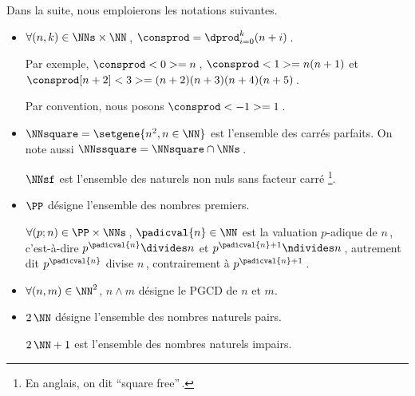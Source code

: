 Dans la suite, nous emploierons les notations suivantes.

\begin{itemize}
	\item $\forall (n, k) \in \NNs \times \NN$\,, $\consprod = \dprod_{i = 0}^{k} (n + i)$\,. 
	
	\noindent
	Par exemple,
	$\consprod<0> = n$\,,
	$\consprod<1> = n (n+1)$
	et
	$\consprod[n+2]<3> = (n+2) (n+3) (n+4) (n+5)$\,.
	
	\noindent
	Par convention, nous posons $\consprod<-1> = 1$\,.


	\medskip
	\item $\NNsquare = \setgene{n^2, n \in \NN}$ est l'ensemble des carrés parfaits.
	On note aussi $\NNssquare = \NNsquare \cap \NNs$\,.

	\noindent
	$\NNsf$ est l'ensemble des naturels non nuls sans facteur carré
	\footnote{
		En anglais, on dit \enquote{square free}\,.
	}.


	\medskip
	\item $\PP$ désigne l'ensemble des nombres premiers.
	
	\noindent
	$\forall (p ; n) \in \PP \times \NNs$\,, $\padicval{n} \in \NN$ est la valuation $p$-adique de $n$\,,
	c'est-à-dire 
	$p^{\padicval{n}} \divides n$ et $p^{\padicval{n} + 1} \ndivides n$\,,
	autrement dit
	$p^{\padicval{n}}$ divise $n$\,, contrairement à $p^{\padicval{n} + 1}$\,.


	\medskip
	\item $\forall (n , m) \in \NN^2$, $n \wedge m$ désigne le PGCD de $n$ et $m$.

	
	\medskip
	\item $2\,\NN$ désigne l'ensemble des nombres naturels pairs.
	
	\noindent
	$2\,\NN + 1$ est l'ensemble des nombres naturels impairs.
\end{itemize}